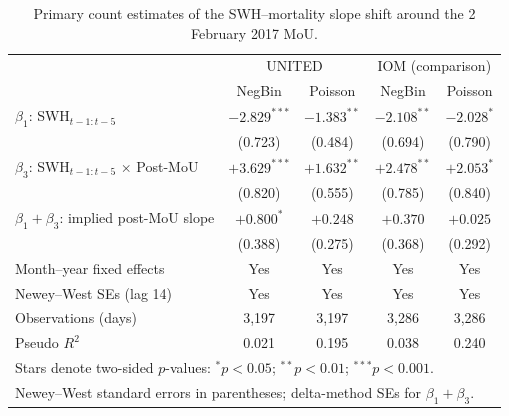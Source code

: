 \begin{table}[h!]
\centering
\small
\caption{Primary count estimates of the SWH--mortality slope shift around the 2 February 2017 MoU.}
\label{tab:primary}
\begin{tabular}{lcccc}
\hline
                              & \multicolumn{2}{c}{UNITED} & \multicolumn{2}{c}{IOM (comparison)} \\
                              & NegBin & Poisson & NegBin & Poisson \\
\hline
$\beta_1$: SWH$_{t-1:t-5}$            & $-2.829^{***}$ & $-1.383^{**}$ & $-2.108^{**}$ & $-2.028^{*}$ \\
                                      & (0.723) & (0.484) & (0.694) & (0.790) \\
$\beta_3$: SWH$_{t-1:t-5}$ $\times$ Post-MoU & $+3.629^{***}$ & $+1.632^{**}$ & $+2.478^{**}$ & $+2.053^{*}$ \\
                                      & (0.820) & (0.555) & (0.785) & (0.840) \\
$\beta_1+\beta_3$: implied post-MoU slope    & $+0.800^{*}$ & $+0.248$ & $+0.370$ & $+0.025$ \\
                                      & (0.388) & (0.275) & (0.368) & (0.292) \\
\hline
Month--year fixed effects             & Yes            & Yes           & Yes            & Yes          \\
Newey--West SEs (lag 14)              & Yes            & Yes           & Yes            & Yes          \\
Observations (days)                   & 3,197 & 3,197 & 3,286 & 3,286 \\
Pseudo $R^{2}$                        & 0.021 & 0.195 & 0.038 & 0.240 \\
\hline
\multicolumn{5}{l}{\footnotesize Stars denote two-sided $p$-values: $^{*}p<0.05$; $^{**}p<0.01$; $^{***}p<0.001$.} \\
\multicolumn{5}{l}{\footnotesize Newey--West standard errors in parentheses; delta-method SEs for $\beta_1+\beta_3$.} \\
\end{tabular}
\end{table}
